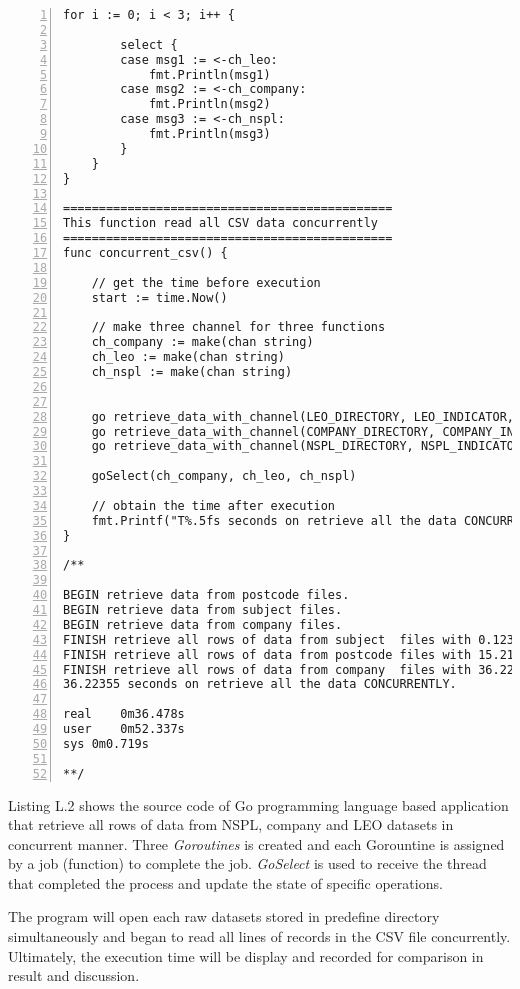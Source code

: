 \begin{lstlisting}[breaklines, frame=single, numbers=left, caption={Go concurrent program source codes. (concurrent-csv.go)}, label=commandline-02]
	for i := 0; i < 3; i++ {
	
		select {
		case msg1 := <-ch_leo:
			fmt.Println(msg1)
		case msg2 := <-ch_company:
			fmt.Println(msg2)
		case msg3 := <-ch_nspl:
			fmt.Println(msg3)
		}
	}
}

==============================================
This function read all CSV data concurrently 
==============================================
func concurrent_csv() {

	// get the time before execution
	start := time.Now()
	
	// make three channel for three functions
	ch_company := make(chan string)
	ch_leo := make(chan string)
	ch_nspl := make(chan string)
	
	
	go retrieve_data_with_channel(LEO_DIRECTORY, LEO_INDICATOR, ch_leo);
	go retrieve_data_with_channel(COMPANY_DIRECTORY, COMPANY_INDICATOR, ch_company);
	go retrieve_data_with_channel(NSPL_DIRECTORY, NSPL_INDICATOR, ch_nspl);
	
	goSelect(ch_company, ch_leo, ch_nspl) 
	
	// obtain the time after execution
	fmt.Printf("T%.5fs seconds on retrieve all the data CONCURRENTLY. \n", time.Since(start).Seconds())
}

/**

BEGIN retrieve data from postcode files. 
BEGIN retrieve data from subject files. 
BEGIN retrieve data from company files. 
FINISH retrieve all rows of data from subject  files with 0.12362 seconds. 
FINISH retrieve all rows of data from postcode files with 15.21926 seconds. 
FINISH retrieve all rows of data from company  files with 36.22334 seconds. 
36.22355 seconds on retrieve all the data CONCURRENTLY. 

real	0m36.478s
user	0m52.337s
sys	0m0.719s

**/

\end{lstlisting}

Listing L.2 shows the source code of Go programming language based application that retrieve all rows of data from NSPL, company and LEO datasets in concurrent manner. Three \textit{Goroutines} is created and each Gorountine is assigned by a job (function) to complete the job. \textit{GoSelect} is used to receive the thread that completed the process and update the state of specific operations. 

The program will open each raw datasets stored in predefine directory simultaneously and began to read all lines of records in the CSV file concurrently. Ultimately, the execution time will be display and recorded for comparison in result and discussion. 

